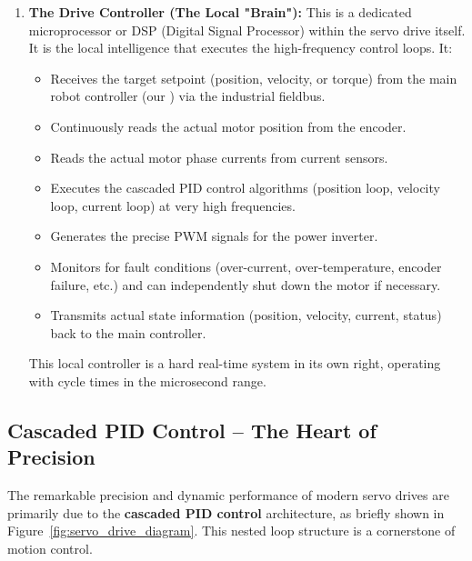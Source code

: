 \begin{enumerate}
\begin{tipbox}{Engineering Insight: Space Vector Modulation (SVM)}
While simple PWM can control the motor, advanced servo drives use more sophisticated PWM techniques like Space Vector Modulation. SVM provides smoother torque, better utilization of the DC bus voltage, and lower harmonic distortion in the motor currents, leading to more efficient and precise control. This is complex digital signal processing happening at very high frequencies (tens of kHz).
\end{tipbox}
    
    \item \textbf{The Drive Controller (The Local "Brain"):} This is a dedicated microprocessor or DSP (Digital Signal Processor) within the servo drive itself. It is the local intelligence that executes the high-frequency control loops. It:
    \begin{itemize}
        \item Receives the target setpoint (position, velocity, or torque) from the main robot controller (our ) via the industrial fieldbus.
        \item Continuously reads the actual motor position from the encoder.
        \item Reads the actual motor phase currents from current sensors.
        \item Executes the cascaded PID control algorithms (position loop, velocity loop, current loop) at very high frequencies.
        \item Generates the precise PWM signals for the power inverter.
        \item Monitors for fault conditions (over-current, over-temperature, encoder failure, etc.) and can independently shut down the motor if necessary.
        \item Transmits actual state information (position, velocity, current, status) back to the main controller.
    \end{itemize}
    This local controller is a hard real-time system in its own right, operating with cycle times in the microsecond range.
\end{enumerate}

\subsection{Cascaded PID Control – The Heart of Precision}
\label{subsec:cascaded_pid}

The remarkable precision and dynamic performance of modern servo drives are primarily due to the \textbf{cascaded PID control} architecture, as briefly shown in Figure~\ref{fig:servo_drive_diagram}. This nested loop structure is a cornerstone of motion control.


